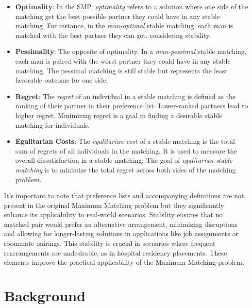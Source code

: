 \begin{itemize}
    \item \textbf{Optimality}: In the SMP, \emph{optimality} refers to a solution where one side of the matching get the best possible partner they could have in any stable matching. For instance, in the \emph{man-optimal} stable matching, each man is matched with the best partner they can get, considering stability.
    
    \item \textbf{Pessimality}: The opposite of optimality. In a \emph{man-pessimal} stable matching, each man is paired with the worst partner they could have in any stable matching. The pessimal matching is still stable but represents the least favorable outcome for one side.
    
    \item \textbf{Regret}: The \emph{regret} of an individual in a stable matching is defined as the ranking of their partner in their preference list. Lower-ranked partners lead to higher regret. Minimizing regret is a goal in finding a desirable stable matching for individuals.
    
    \item \textbf{Egalitarian Costs}: The \emph{egalitarian cost} of a stable matching is the total sum of regrets of all individuals in the matching. It is used to measure the overall dissatisfaction in a stable matching. The goal of \emph{egalitarian stable matching} is to minimize the total regret across both sides of the matching problem. \cite{gusfield} 
\end{itemize}

It's important to note that preference lists and accompanying definitions are not present in the original Maximum Matching problem but they significantly enhance its applicability to real-world scenarios. Stability ensures that no matched pair would prefer an alternative arrangement, minimizing disruptions and allowing for longer-lasting solutions in applications like job assignments or roommate pairings. This stability is crucial in scenarios where frequent rearrangements are undesirable, as in hospital residency placements. These elements improve the practical applicability of the Maximum Matching problem.

\section*{Background}
